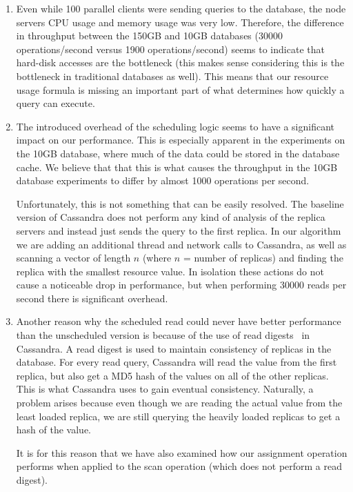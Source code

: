 \begin{enumerate}

\item Even while 100 parallel clients were sending queries to the database, the node servers CPU usage and memory usage was very low. Therefore, the difference in throughput between the 150GB and 10GB databases (30000 operations/second versus 1900 operations/second) seems to indicate that hard-disk accesses are the bottleneck (this makes sense considering this is the bottleneck in traditional databases as well). This means that our resource usage formula is missing an important part of what determines how quickly a query can execute.

\item The introduced overhead of the scheduling logic seems to have a significant impact on our performance. This is especially apparent in the experiments on the 10GB database, where much of the data could be stored in the database cache. We believe that that this is what causes the throughput in the 10GB database experiments to differ by almost 1000 operations per second.

Unfortunately, this is not something that can be easily resolved. The baseline version of Cassandra does not perform any kind of analysis of the replica servers and instead just sends the query to the first replica. In our algorithm we are adding an additional thread and network calls to Cassandra, as well as scanning a vector of length $n$ (where $n$ = number of replicas) and finding the replica with the smallest resource value. In isolation these actions do not cause a noticeable drop in performance, but when performing 30000 reads per second there is significant overhead.

\item Another reason why the scheduled read could never have better performance than the unscheduled version is because of the use of read digests~\cite{readDigest} in Cassandra. A read digest is used to maintain consistency of replicas in the database. For every read query, Cassandra will read the value from the first replica, but also get a MD5 hash of the values on all of the other replicas. This is what Cassandra uses to gain eventual consistency. Naturally, a problem arises because even though we are reading the actual value from the least loaded replica, we are still querying the heavily loaded replicas to get a hash of the value.

It is for this reason that we have also examined how our assignment operation performs when applied to the scan operation (which does not perform a read digest).

\end{enumerate}

